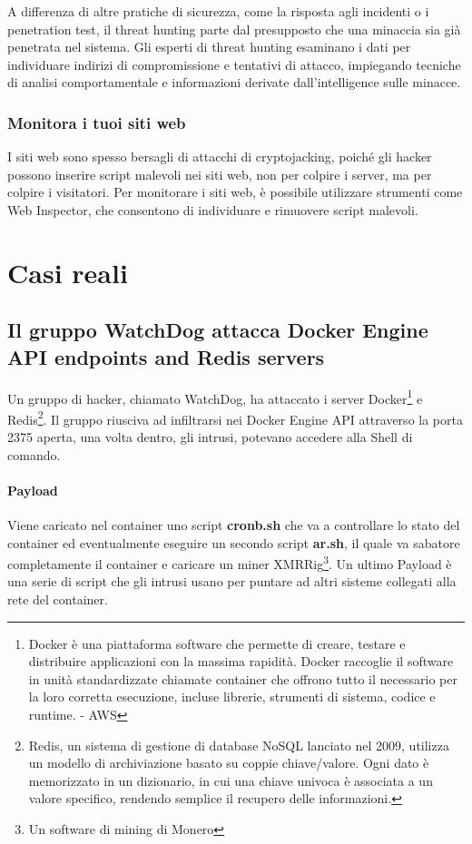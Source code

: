 \documentclass[12pt,a4paper]{article}
\begin{document}
A differenza di altre pratiche di sicurezza, come la risposta agli incidenti o i
penetration test, il threat hunting parte dal presupposto che una minaccia sia
già penetrata nel sistema. Gli esperti di threat hunting esaminano i dati per
individuare indirizi di compromissione e tentativi di attacco, impiegando
tecniche di analisi comportamentale e informazioni derivate dall'intelligence
sulle minacce.

\subsubsection{Monitora i tuoi siti web}
I siti web sono spesso bersagli di attacchi di cryptojacking, poiché gli hacker
possono inserire script malevoli nei siti web, non per colpire i server, ma per
colpire i visitatori. Per monitorare i siti web, è possibile utilizzare
strumenti come Web Inspector, che consentono di individuare e rimuovere script
malevoli.

\newpage

\section{Casi reali}

\subsection{Il gruppo WatchDog attacca Docker Engine API endpoints and Redis servers}
Un gruppo di hacker, chiamato WatchDog, ha attaccato i server
Docker\footnote{Docker è una piattaforma software che permette di creare,
testare e distribuire applicazioni con la massima rapidità. Docker raccoglie il
software in unità standardizzate chiamate container che offrono tutto il
necessario per la loro corretta esecuzione, incluse librerie, strumenti di
sistema, codice e runtime. - AWS} e Redis\footnote{Redis, un sistema di gestione
di database NoSQL lanciato nel 2009, utilizza un modello di archiviazione basato
su coppie chiave/valore. Ogni dato è memorizzato in un dizionario, in cui una
chiave univoca è associata a un valore specifico, rendendo semplice il recupero
delle informazioni.}. Il gruppo riusciva ad infiltrarsi nei Docker Engine API
attraverso la porta 2375 aperta, una volta dentro, gli intrusi, potevano
accedere alla Shell di comando.

\paragraph{Payload} Viene caricato nel container uno script \textbf{cronb.sh}
che va a controllare lo stato del container ed eventualmente eseguire un secondo
script \textbf{ar.sh}, il quale va sabatore completamente il container e
caricare un miner XMRRig\footnote{Un software di mining di Monero}. Un ultimo
Payload è una serie di script che gli intrusi usano per puntare ad altri sisteme
collegati alla rete del container.\cite{WatchDog}
\end{document}
